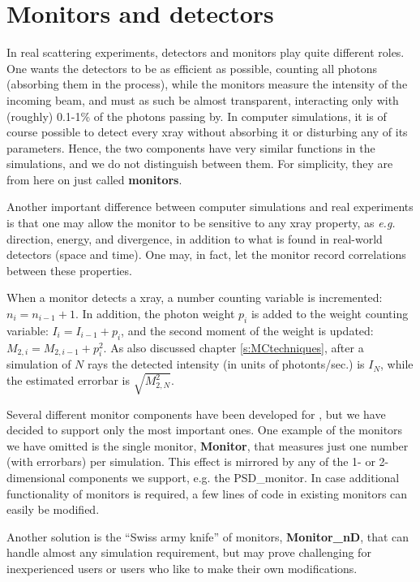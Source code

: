 \chapter{Monitors and detectors}

In real scattering experiments, detectors and monitors play quite
different roles. One wants the detectors to be as efficient as
possible, counting all photons (absorbing them in the process),
while the monitors measure the intensity of the incoming beam, and must
as such be almost transparent, interacting only with (roughly) 0.1-1\%
of the photons passing by. In computer simulations, it is
of course possible to detect every xray without
absorbing it or disturbing any of its parameters. Hence, the two components
have very similar functions in the simulations, and we do
not distinguish between them. For simplicity, they are from here on
just called {\bf monitors}.

Another important difference between computer simulations
and real experiments is
that one may allow the monitor to be sensitive to any xray property,
as {\em e.g.} direction, energy, and divergence, in addition to what
is found in real-world detectors (space and time). One may, in
fact, let the monitor    record correlations between these properties.

When a monitor detects a xray,
a number counting variable is incremented: $n_i = n_{i-1}+1$.
In addition, the photon
weight $p_i$ is added to the weight counting variable:
$I_i = I_{i-1} + p_i$,
and the second moment of the weight is
updated: $M_{2,i} = M_{2,i-1} + p_i^2$.
As also discussed chapter \ref{s:MCtechniques}, after a simulation of $N$ rays
the detected intensity (in units of photonts/sec.) is $I_N$,
while the estimated errorbar is $\sqrt{M_{2,N}^2}$.

Several different monitor components have been developed for
\MCX , but we have decided to support only the most important ones.
One example of the monitors we have omitted is the single monitor,
{\bf Monitor},
that measures just one number (with errorbars) per simulation.
This effect is mirrored by any of the 1- or 2-dimensional components
we support, e.g. the {\rm PSD\_monitor}.
In case additional functionality of monitors is required,
a few lines of code in existing monitors can easily be modified.

Another solution is the ``Swiss army knife'' of monitors, {\bf Monitor\_nD}, that can handle
almost any simulation requirement, but may prove challenging for inexperienced users or users who like to make their own modifications.

\newpage














\newpage

